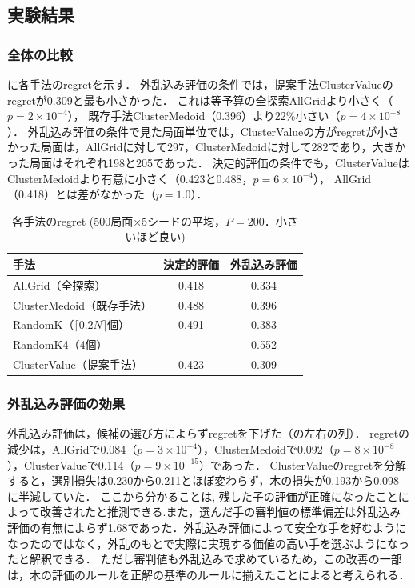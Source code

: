 \documentclass[submit]{ipsj}
\begin{document}
\subsection{実験結果}

\subsubsection{全体の比較}
に各手法のregretを示す．
外乱込み評価の条件では，提案手法ClusterValueのregretが0.309と最も小さかった．
これは等予算の全探索AllGridより小さく（$p=2\times10^{-4}$），
既存手法ClusterMedoid（0.396）より22\%小さい（$p=4\times10^{-8}$）．
外乱込み評価の条件で見た局面単位では，ClusterValueの方がregretが小さかった局面は，AllGridに対して297，ClusterMedoidに対して282であり，大きかった局面はそれぞれ198と205であった．
決定的評価の条件でも，ClusterValueはClusterMedoidより有意に小さく（0.423と0.488，$p=6\times10^{-4}$），
AllGrid（0.418）とは差がなかった（$p=1.0$）．

\begin{table}[tb]
\caption{各手法のregret (500局面×5シードの平均，$P=200$．小さいほど良い)}
\label{tab:main}
\centering
\begin{tabular}{lcc}\hline\hline
手法 & 決定的評価 & 外乱込み評価 \\\hline
AllGrid（全探索） & 0.418 & 0.334 \\
ClusterMedoid（既存手法） & 0.488 & 0.396 \\
RandomK（$\lceil 0.2N \rceil$個） & 0.491 & 0.383 \\
RandomK4（4個） & -- & 0.552 \\
ClusterValue（提案手法） & 0.423 & 0.309 \\\hline
\end{tabular}
\end{table}

\subsubsection{外乱込み評価の効果}
外乱込み評価は，候補の選び方によらずregretを下げた（の左右の列）．
regretの減少は，AllGridで0.084（$p=3\times10^{-4}$），ClusterMedoidで0.092（$p=8\times10^{-8}$），ClusterValueで0.114（$p=9\times10^{-15}$）であった．
ClusterValueのregretを分解すると，選別損失は0.230から0.211とほぼ変わらず，木の損失が0.193から0.098に半減していた．
ここから分かることは, 残した子の評価が正確になったことによって改善されたと推測できる.また，選んだ手の審判値の標準偏差は外乱込み評価の有無によらず1.68であった．外乱込み評価によって安全な手を好むようになったのではなく，外乱のもとで実際に実現する価値の高い手を選ぶようになったと解釈できる．
ただし審判値も外乱込みで求めているため，この改善の一部は，木の評価のルールを正解の基準のルールに揃えたことによると考えられる．
\end{document}
